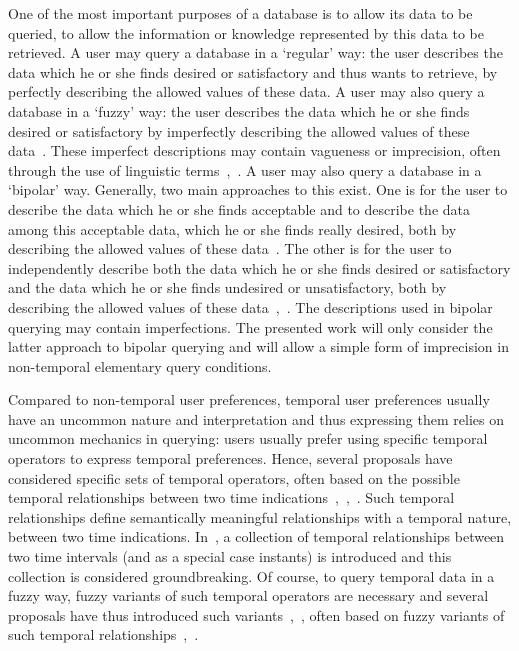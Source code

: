 \documentclass[runningheads,a4paper]{llncs}
\begin{document}
One of the most important purposes of a database is to allow its data to be queried, to allow the information or knowledge represented by this data to be retrieved. A user may query a database in a `regular' way: the user describes the data which he or she finds desired or satisfactory and thus wants to retrieve, by perfectly describing the allowed values of these data. A user may also query a database in a `fuzzy' way: the user describes the data which he or she finds desired or satisfactory by imperfectly describing the allowed values of these data~\cite{Zadrozny2008hrfipd}. These imperfect descriptions may contain vagueness or imprecision, often through the use of linguistic terms~\cite{Devos1998jql},~\cite{Kacprzyk2001is}. A user may also query a database in a `bipolar' way. Generally, two main approaches to this exist. One is for the user to describe the data which he or she finds acceptable and to describe the data among this acceptable data, which he or she finds really desired, both by describing the allowed values of these data~\cite{Dubois2002lnai}. The other is for the user to independently describe both the data which he or she finds desired or satisfactory and the data which he or she finds undesired or unsatisfactory, both by describing the allowed values of these data~\cite{DeTre2010ieeetfs},~\cite{Matthe2011ijis}. The descriptions used in bipolar querying may contain imperfections. The presented work will only consider the latter approach to bipolar querying and will allow a simple form of imprecision in non-temporal elementary query conditions.

Compared to non-temporal user preferences, temporal user preferences usually have an uncommon nature and interpretation and thus expressing them relies on uncommon mechanics in querying: users usually prefer using specific temporal operators to express temporal preferences. Hence, several proposals have considered specific sets of temporal operators, often based on the possible temporal relationships between two time indications~\cite{Pons2012ijcis},~\cite{Galindo2001},~\cite{Schockaert2008ieeetfs}. Such temporal relationships define semantically meaningful relationships with a temporal nature, between two time indications. In~\cite{Allen1983cacm}, a collection of temporal relationships between two time intervals (and as a special case instants) is introduced and this collection is considered groundbreaking. Of course, to query temporal data in a fuzzy way, fuzzy variants of such temporal operators are necessary and several proposals have thus introduced such variants~\cite{Pons2012ipmu},~\cite{Galindo2001}, often based on fuzzy variants of such temporal relationships~\cite{Schockaert2008ieeetfs},~\cite{Pons2013ijufkbs}.
\end{document}
